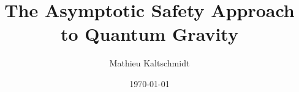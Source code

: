 \title{The Asymptotic Safety Approach to Quantum Gravity}
\author{Mathieu Kaltschmidt}
\date{\today}

\newtheorem{statements}{Statements}[chapter]

\usepackage{fancyhdr}
\fancyhfoffset{0pt}

\usepackage[a4paper,
			width = 150mm,
			top = 30mm,
		    bottom=30mm,
		    ]{geometry}
\usepackage[onehalfspacing]{setspace}


\renewcommand{\chaptermark}[1]{
    \markboth{\mbox{\@chapapp}\ \thechapter.\ \ #1}{}%
}
\renewcommand{\sectionmark}[1]{
    \markright{\thesection\ \ #1}{}
}

\renewcommand*\raggedchapter{\centering}
\renewcommand*{\chapterformat}{%
  \chapappifchapterprefix{\nobreakspace}\thechapter\autodot%
  \IfUsePrefixLine{%
    \par\nobreak\vspace{-\parskip}\vspace{-.6\baselineskip}%
    \rule{0.9\textwidth}{0.5pt}\vspace{-1\baselineskip}%
  }{\enskip}%
}
\renewcommand\chapterlineswithprefixformat[3]{%
#2#3
}



\pagestyle{fancy}
	\fancyhf{}
	\fancyhead[LE]{\footnotesize\nouppercase{\leftmark}}
	\fancyhead[RO]{\footnotesize\nouppercase{\rightmark}}
	\fancyfoot[C]{\thepage}
	\renewcommand{\headrulewidth}{0.2pt}
	\renewcommand{\footrulewidth}{0pt}



\usepackage{amsmath, amssymb, commath, mathtools}
\usepackage{physics}
\usepackage{slashed}
\usepackage[hyperref]{ntheorem}
\usepackage{xfrac}
\usepackage[separate-uncertainty]{siunitx}
\usepackage{relsize} %
\usepackage{bbm}

\usepackage{array} %
\usepackage{booktabs} %

